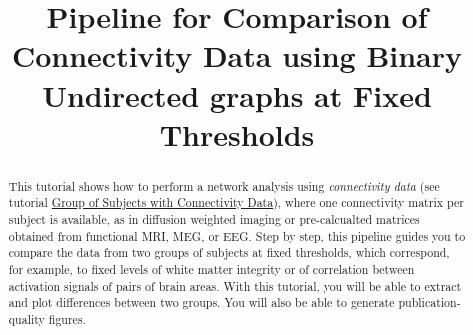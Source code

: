 \documentclass[justified]{tufte-handout}
\title[Comparison of Connectivity Data using BUT]{Pipeline for Comparison of Connectivity Data using Binary Undirected graphs at Fixed Thresholds}
\begin{document}
\maketitle

\begin{abstract}
\noindent
This tutorial shows how to perform a network analysis using \emph{connectivity data} (see tutorial \href{https://github.com/braph-software/BRAPH-2/tree/develop/tutorials/general/tut_gr_con}{Group of Subjects with Connectivity Data}), where one connectivity matrix per subject is available, as in diffusion weighted imaging or pre-calcualted matrices obtained from functional MRI, MEG, or EEG. Step by step, this pipeline guides you to compare the data from two groups of subjects at fixed thresholds, which correspond, for example, to fixed levels of white matter integrity or of correlation between activation signals of pairs of brain areas.  With this tutorial, you will be able to extract and plot differences between two groups. You will also be able to generate publication-quality figures.
\end{abstract}
\end{document}
